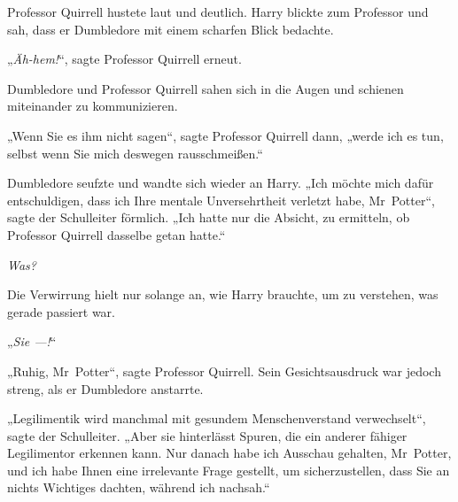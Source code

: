 Professor Quirrell hustete laut und deutlich. Harry blickte zum Professor und sah, dass er Dumbledore mit einem scharfen Blick bedachte.

„\emph{Äh-hem!}“, sagte Professor Quirrell erneut.

Dumbledore und Professor Quirrell sahen sich in die Augen und schienen miteinander zu kommunizieren.

„Wenn Sie es ihm nicht sagen“, sagte Professor Quirrell dann, „werde ich es tun, selbst wenn Sie mich deswegen rausschmeißen.“

Dumbledore seufzte und wandte sich wieder an Harry. „Ich möchte mich dafür entschuldigen, dass ich Ihre mentale Unversehrtheit verletzt habe, Mr~Potter“, sagte der Schulleiter förmlich. „Ich hatte nur die Absicht, zu ermitteln, ob Professor Quirrell dasselbe getan hatte.“

\emph{Was?}

Die Verwirrung hielt nur solange an, wie Harry brauchte, um zu verstehen, was gerade passiert war.

„\emph{Sie —!}“

„Ruhig, Mr~Potter“, sagte Professor Quirrell. Sein Gesichtsausdruck war jedoch streng, als er Dumbledore anstarrte.

„Legilimentik wird manchmal mit gesundem Menschenverstand verwechselt“, sagte der Schulleiter. „Aber sie hinterlässt Spuren, die ein anderer fähiger Legilimentor erkennen kann. Nur danach habe ich Ausschau gehalten, Mr~Potter, und ich habe Ihnen eine irrelevante Frage gestellt, um sicherzustellen, dass Sie an nichts Wichtiges dachten, während ich nachsah.“

